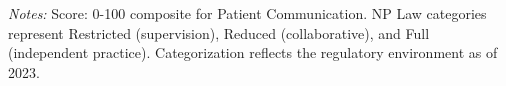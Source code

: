 \begin{table}[htbp]
    \centering
    \caption{Summary of OAS CAHPS: Communication by Authority and Year}
    \label{tab:oas_grp1}
    \vspace{0.2cm}
    \vspace{0.1cm}
    \begin{minipage}{\textwidth}
        \footnotesize \textit{Notes:} Score: 0-100 composite for Patient Communication. NP Law categories represent Restricted (supervision), Reduced (collaborative), and Full (independent practice). Categorization reflects the regulatory environment as of 2023.
    \end{minipage}
\end{table}